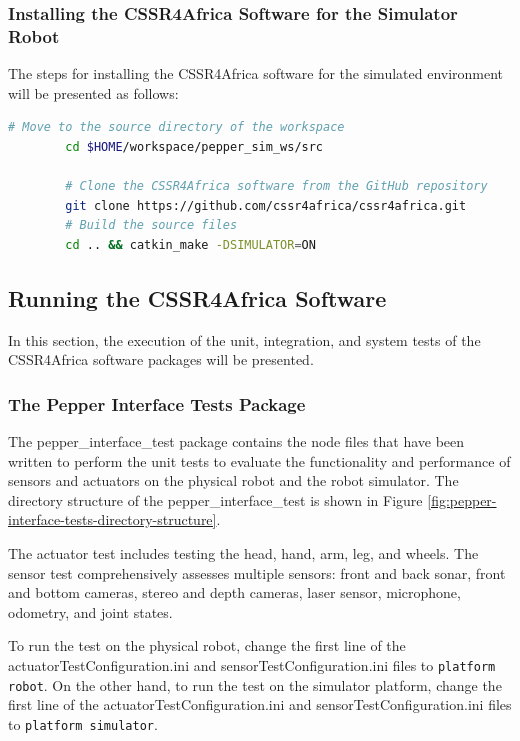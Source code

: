 \documentclass{CSSRforAfrica}
\begin{document}
{		\subsubsection{Installing the CSSR4Africa Software for the Simulator Robot}
		\label{sim-soft}
		The steps for installing the CSSR4Africa software for the simulated environment will be presented as follows:
		
		\begin{lstlisting}[style=withoutNumbering, language=bash]
		# Move to the source directory of the workspace
		cd $HOME/workspace/pepper_sim_ws/src
		
		# Clone the CSSR4Africa software from the GitHub repository
		git clone https://github.com/cssr4africa/cssr4africa.git
		# Build the source files
		cd .. && catkin_make -DSIMULATOR=ON
		\end{lstlisting}
		
		\subsection{Running the CSSR4Africa Software}
		In this section, the execution of the unit, integration, and system tests of the CSSR4Africa software packages will be presented.
		
		\subsubsection{The Pepper Interface Tests Package}
		The pepper\_interface\_test package contains the node files that have been written to perform the unit tests to evaluate the functionality and performance of sensors and actuators on the physical robot and the robot simulator. The directory structure of the pepper\_interface\_test is shown in Figure \ref{fig:pepper-interface-tests-directory-structure}.
		
		The actuator test includes testing the head, hand, arm, leg, and wheels. The sensor test comprehensively assesses multiple sensors: front and back sonar, front and bottom cameras, stereo and depth cameras, laser sensor, microphone, odometry, and joint states.
		
		\noindent To run the test on the physical robot, change the first line of the actuatorTestConfiguration.ini and sensorTestConfiguration.ini files to \texttt{platform robot}. On the other hand, to run the test on the simulator platform, change the first line of the actuatorTestConfiguration.ini and sensorTestConfiguration.ini files to \texttt{platform simulator}. 
		
}
\end{document}
